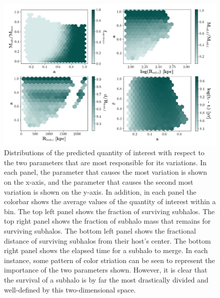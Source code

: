 \documentclass[fleqn,usenatbib]{mnras}
\begin{document}
\begin{figure}[h]
	\includegraphics[width=\textwidth]{Figures/bestSpaces}
    \caption{Distributions of the predicted quantity of interest with respect to the two parameters that are most responsible for its variations. In each panel, the parameter that causes the most variation is shown on the x-axis, and the parameter that causes the second most variation is shown on the y-axis. In addition, in each panel the colorbar shows the average values of the quantity of interest within a bin. The top left panel shows the fraction of surviving subhalos. The top right panel shows the fraction of subhalo mass that remains for surviving subhalos. The bottom left panel shows the fractional distance of surviving subhalos from their host's center. The bottom right panel shows the elapsed time for a subhalo to merge. In each instance, some pattern of color striation can be seen to represent the importance of the two parameters shown. However, it is clear that the survival of a subhalo is by far the most drastically divided and well-defined by this two-dimensional space. }
    \label{fig:bestSpaces}
\end{figure}
\end{document}
